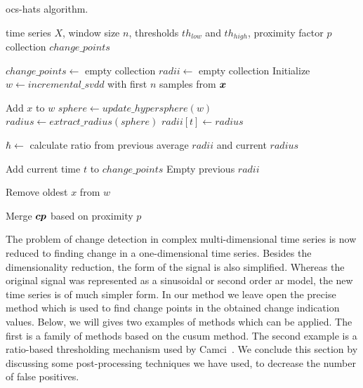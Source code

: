 \begin{algorithm}
\caption{\acrlong{ocs-hats} algorithm.}
\label{alg:ocs-hats}
\begin{algorithmic}[1]
\Require time series $X$, window size $n$, thresholds $th_{low}$ and $th_{high}$, proximity factor $p$
\Ensure collection $change\_points$
\item[]
\State $change\_points \leftarrow$ empty collection
\State $radii \leftarrow$ empty collection
\State Initialize $w \leftarrow incremental\_svdd$ with first $n$ samples from $\vectorsym{x}$
\item[]
  \item[]
  \State Add $x$ to $w$
  \State $sphere \leftarrow update\_hypersphere(w)$
  \State $radius \leftarrow extract\_radius(sphere)$
  \State $radii[t] \leftarrow radius$
  \item[]
  \State $\hbar \leftarrow$ calculate ratio from previous average $radii$ and current $radius$
  \item[]
    \State Add current time $t$ to $change\_points$
    \State Empty previous $radii$
  \EndIf
  \item[]
  \State Remove oldest $x$ from $w$
\EndWhile

\item[]

\State Merge $\vectorsym{cp}$ based on proximity $p$
\end{algorithmic}
\end{algorithm}

The problem of change detection in complex multi-dimensional time series is now reduced to finding change in a one-dimensional time series.
Besides the dimensionality reduction, the form of the signal is also simplified.
Whereas the original signal was represented as a sinusoidal or second order \gls{ar} model, the new time series is of much simpler form.
In our method we leave open the precise method which is used to find change points in the obtained change indication values.
Below, we will gives two examples of methods which can be applied.
The first is a family of methods based on the \gls{cusum} method.
The second example is a ratio-based thresholding mechanism used by Camci~\cite{camci2010change}.
We conclude this section by discussing some post-processing techniques we have used, to decrease the number of false positives.

